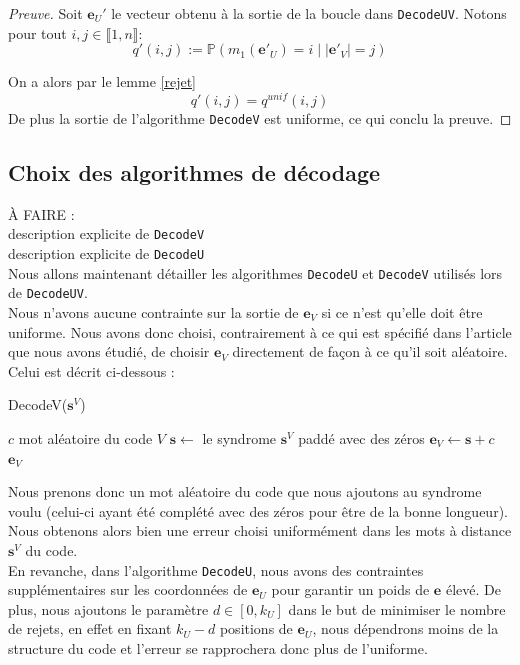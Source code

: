 \documentclass[12pt]{article}
\theoremstyle{plain}
\theoremstyle{definition}
\newcommand{\e}{\mathbf{e}}
\newcommand{\s}{\mathbf{s}}
\begin{document}
\begin{proof}[Preuve]
Soit $\e_U'$ le vecteur obtenu à la sortie de la boucle dans \verb|DecodeUV|.  Notons pour tout $i,j \in \llbracket 1,n \rrbracket$:
$$q'(i,j) := \mathbb{P}(m_1(\mathbf{e'}_U)=i\;|\;|\mathbf{e'}_V|=j)$$

\noindent On a alors par le lemme \ref{rejet}
$$q'(i,j) = q^{unif}(i,j)$$
De plus la sortie de l'algorithme \verb|DecodeV| est uniforme, ce qui conclu la preuve.
\end{proof}

\subsection{Choix des algorithmes de décodage}
À FAIRE :\\
description explicite de \verb|DecodeV| \\
description explicite de \verb|DecodeU| \\

\noindent Nous allons maintenant détailler les algorithmes \verb|DecodeU| et \verb|DecodeV| utilisés lors de \verb|DecodeUV|. \\
Nous n'avons aucune contrainte sur la sortie de $\e_V$ si ce n'est qu'elle doit être uniforme. Nous avons donc choisi, contrairement à ce qui est spécifié dans l'article que nous avons étudié, de choisir $\e_V$ directement de façon à ce qu'il soit aléatoire. Celui est décrit ci-dessous :

\begin{algorithm}
	\caption{DecodeV($\s^V$)}
	\begin{algorithmic}[1]
    	\STATE $c$ mot aléatoire du code $V$
    	\STATE $\s \leftarrow$ le syndrome $\s^V$ paddé avec des zéros
    	\STATE $\e_V \leftarrow \s + c$
    	\RETURN $\e_V$
    \end{algorithmic}
\end{algorithm}

\noindent Nous prenons donc un mot aléatoire du code que nous ajoutons au syndrome voulu (celui-ci ayant été complété avec des zéros pour être de la bonne longueur). 
Nous obtenons alors bien une erreur choisi uniformément dans les mots à distance $\s^V$ du code.\\

\noindent En revanche, dans l'algorithme \verb|DecodeU|, nous avons des contraintes supplémentaires sur les coordonnées de $\e_U$ pour garantir un poids de $\e$ élevé. De plus, nous ajoutons le paramètre $d\in [0,k_U]$ dans le but de minimiser le nombre de rejets, en effet en fixant $k_U - d$ positions de $\e_U$, nous dépendrons moins de la structure du code et l'erreur se rapprochera donc plus de l'uniforme.
\end{document}
